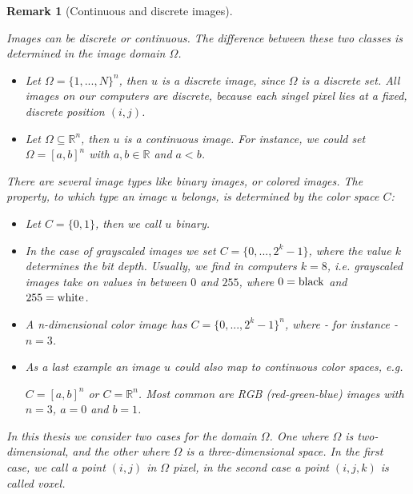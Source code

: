 \documentclass{scrreprt}
\newtheorem{remark}[theorem]{Remark}
\begin{document}
        \begin{remark}[Continuous and discrete images] %
        \label{rem:continuous_vs_discrete}
            
            Images can be discrete or continuous. The difference between these two classes is determined in the image domain $\Omega$.
                \begin{itemize}
                    \item Let $\Omega = \{ 1, ..., N \}^{n}$, then $u$ is a discrete image, since $\Omega$ is a discrete set. All images on our computers are discrete, because each singel pixel lies at a fixed, discrete position $(i,j)$.
                    \item Let $\Omega \subseteq \mathbb{R}^{n}$, then $u$ is a continuous image. For instance, we could set $\Omega = [a, b]^{n}$ with $a, b \in \mathbb{R}$ and $a < b$.
                \end{itemize}
            There are several image types like binary images, or colored images. The property, to which type an image $u$ belongs, is determined by the color space $C$:
                \begin{itemize}
                    \item Let $C = \{ 0, 1 \}$, then we call $u$ binary.
                    \item In the case of grayscaled images we set $C = \{ 0, ..., 2^{k}-1 \}$, where the value $k$ determines the bit depth. Usually, we find in computers $k = 8$, i.e. grayscaled images take on values in between $0$ and $255$, where $0 = \textnormal{black}$ and $255 = \textnormal{white}$.
                    \item A n-dimensional color image has $C = \{ 0, ..., 2^{k}-1 \}^{n}$, where - for instance - $n = 3$.
                    \item As a last example an image $u$ could also map to continuous color spaces, e.g. 

                    $C = [a, b]^{n}$ or $C = \mathbb{R}^{n}$. Most common are RGB (red-green-blue) images with $n = 3$, $a = 0$ and $b = 1$.
                \end{itemize}

            In this thesis we consider two cases for the domain $\Omega$. One where $\Omega$ is two-dimensional, and the other where $\Omega$ is a three-dimensional space. In the first case, we call a point $(i, j)$ in $\Omega$ pixel, in the second case a point $(i, j, k)$ is called voxel.

        \end{remark}
\end{document}
